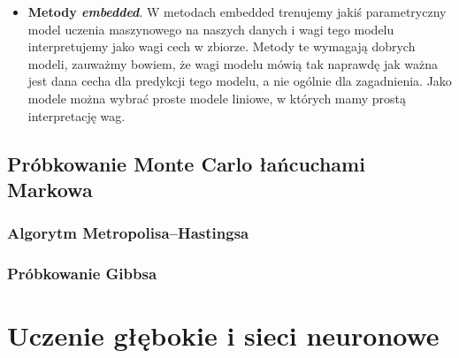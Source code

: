 \documentclass{myclass}
\numberwithin{equation}{section}
\begin{document}
\begin{itemize}
\begin{itemize}
    \end{itemize}

    \item \textbf{Metody \textit{embedded}}. W metodach embedded trenujemy jakiś parametryczny model
    uczenia maszynowego na naszych danych i wagi tego modelu interpretujemy jako wagi cech w
    zbiorze. Metody te wymagają dobrych modeli, zauważmy bowiem, że wagi modelu mówią tak naprawdę
    jak ważna jest dana cecha dla predykcji tego modelu, a nie ogólnie dla zagadnienia. Jako modele
    można wybrać proste modele liniowe, w których mamy prostą interpretację wag.

\end{itemize}

\subsection{Próbkowanie Monte Carlo łańcuchami Markowa}

\subsubsection{Algorytm Metropolisa--Hastingsa}

\subsubsection{Próbkowanie Gibbsa}


\section{Uczenie głębokie i sieci neuronowe}

    
\end{document}
